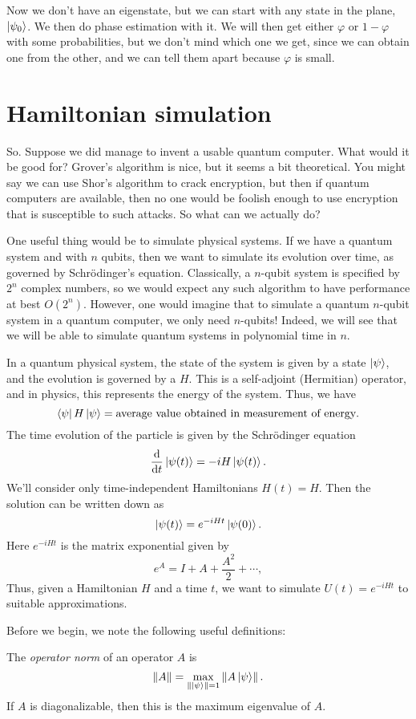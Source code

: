 Now we don't have an eigenstate, but we can start with any state in the plane, $\left\lvert \psi_0\right\rangle$. We then do phase estimation with it. We will then get either $\varphi$ or $1 - \varphi$ with some probabilities, but we don't mind which one we get, since we can obtain one from the other, and we can tell them apart because $\varphi$ is small.

\section{Hamiltonian simulation}
So. Suppose we did manage to invent a usable quantum computer. What would it be good for? Grover's algorithm is nice, but it seems a bit theoretical. You might say we can use Shor's algorithm to crack encryption, but then if quantum computers are available, then no one would be foolish enough to use encryption that is susceptible to such attacks. So what can we actually do?

One useful thing would be to simulate physical systems. If we have a quantum system and with $n$ qubits, then we want to simulate its evolution over time, as governed by Schr\"odinger's equation. Classically, a $n$-qubit system is specified by $2^n$ complex numbers, so we would expect any such algorithm to have performance at best $O(2^n)$. However, one would imagine that to simulate a quantum $n$-qubit system in a quantum computer, we only need $n$-qubits! Indeed, we will see that we will be able to simulate quantum systems in polynomial time in $n$.

In a quantum physical system, the state of the system is given by a state $\left\lvert \psi\right\rangle$, and the evolution is governed by a  $H$. This is a self-adjoint (Hermitian) operator, and in physics, this represents the energy of the system. Thus, we have
\[
  \left\langle \psi \right\rvert H \left\lvert \psi\right\rangle = \text{average value obtained in measurement of energy}.
\]
The time evolution of the particle is given by the Schr\"odinger equation
\[
  \frac{\mathrm{d}}{\mathrm{d} t} \left\lvert \psi(t)\right\rangle = -i H \left\lvert \psi(t)\right\rangle.
\]
We'll consider only time-independent Hamiltonians $H(t) = H$. Then the solution can be written down as
\[
  \left\lvert \psi(t)\right\rangle = e^{-iHt} \left\lvert \psi(0)\right\rangle.
\]
Here $e^{-iHt}$ is the matrix exponential given by
\[
  e^A = I + A + \frac{A^2}{2} + \cdots,
\]
Thus, given a Hamiltonian $H$ and a time $t$, we want to simulate $U(t) = e^{-iHt}$ to suitable approximations.

Before we begin, we note the following useful definitions:
\begin{defi}
  The \emph{operator norm} of an operator $A$ is
  \[
    \|A\| = \max_{\|\left\lvert \psi\right\rangle\| = 1} \left\lVert A \left\lvert \psi\right\rangle\right\rVert.
  \]
  If $A$ is diagonalizable, then this is the maximum eigenvalue of $A$.
\end{defi}

